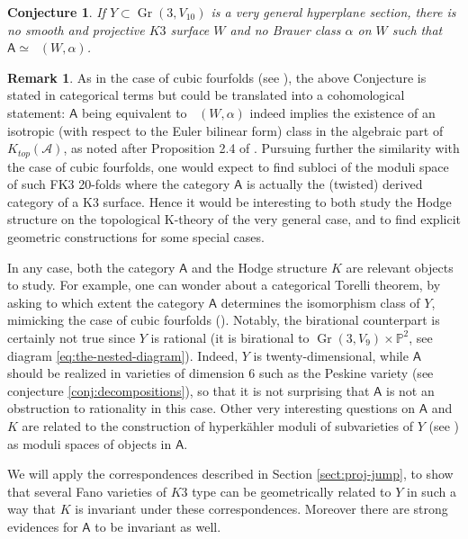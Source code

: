 \documentclass[JEP,XML,SOM,Unicode,NoEqCountersInSection]{cedram}
\let\mathcal\mathscr
\theoremstyle{plain}
\newtheorem{conjecture}[theorem]{Conjecture}
\theoremstyle{definition}
\newtheorem{remark}[theorem]{Remark}
\newcommand{\cat}[1]{\mathsf{#1}}
\DeclareMathOperator{\Db}{{\cat{D}^{\mathrm{b}}}}
\DeclareMathOperator{\Gr}{Gr}
\newcommand{\PP}{\mathbb{P}}
\newcommand{\sheaf}[1]{\mathcal{#1}}
\newcommand{\ka}{\sheaf{A}}
\begin{document}
\begin{conjecture}\label{conj:hodgeandD}
If $Y \subset \Gr(3,V_{10})$ is a very general hyperplane section,
there is no smooth and projective $K3$ surface $W$ and no Brauer class $\alpha$ on $W$ such
that $\cat{A} \simeq \Db(W,\alpha)$.
\end{conjecture}

\begin{remark}
As in the case of cubic fourfolds (see \cite{kuz:4fold,at12}), the above Conjecture is stated in
categorical terms but could be translated into a cohomological statement: $\cat{A}$ being equivalent to $\Db(W, \alpha)$
indeed implies the existence of an isotropic (with respect to the Euler bilinear form) class in the algebraic part of $K_{top}(\ka)$,
as noted after Proposition 2.4 of \cite{at12}.
Pursuing further the similarity with the case of cubic fourfolds, one would expect to find subloci of the moduli space of such FK3 20-folds
where the category $\cat{A}$ is actually the (twisted) derived category of a K3 surface. Hence it would be interesting to both
study the Hodge structure on the topological K-theory of the very general case, and to find explicit geometric constructions
for some special cases.
\end{remark}

\vspace*{-5pt}\enlargethispage{.5\baselineskip}%
In any case, both the category $\cat{A}$ and the Hodge structure $K$ are relevant objects to study.
For example, one can wonder about a categorical Torelli theorem, by asking to which extent
the category $\cat{A}$ determines the isomorphism class of $Y$, mimicking the case of
cubic fourfolds (\cite{huybrechts-rennemo,BLMS,Li-Per-Xiao}). Notably, the birational
counterpart is certainly not true since $Y$ is rational (it is birational to $\Gr(3,V_9) \times \PP^2$,
see diagram \eqref{eq:the-nested-diagram}). Indeed, $Y$
is twenty-dimensional, while $\cat{A}$ should be realized in varieties
of dimension $6$ such as the Peskine variety (see conjecture \ref{conj:decompositions}), so that
it is not surprising that $\cat{A}$ is not an obstruction to rationality in this case.
Other very interesting questions on $\cat{A}$ and $K$ are related to the construction of hyperkähler moduli
of subvarieties of $Y$ (see \cite{debarre-voisin}) as moduli spaces of objects in $\cat{A}$.

We will apply the correspondences described in Section \ref{sect:proj-jump}, to show that several Fano varieties of $K3$ type can be geometrically related to $Y$ in such a way that $K$ is invariant under these correspondences. Moreover there are strong evidences for $\cat{A}$ to be invariant as well.
\end{document}
